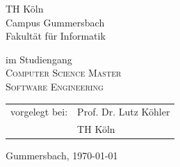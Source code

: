 \begin{titlepage}
\begin{center}
\begin{large} 
\vspace{0.2cm}
\begin{scshape}
TH Köln\\
Campus Gummersbach\\
Fakultät für Informatik
\end{scshape}
\end{large}

\vspace{0.4cm}

\begin{large}
im Studiengang\\ 
\vspace{0.2cm}
\textsc{Computer Science Master \\
Software Engineering}
\end{large}


\vspace{1.0cm}

\begin{tabular}{rl}
	vorgelegt bei:  &  Prof. Dr. Lutz Köhler\\
       					&  \small TH Köln \\[1.0em]
\end{tabular}

\vspace{1.6cm}

\begin{large}
Gummersbach, {\today}
\end{large}
\end{center}

\vspace{2.0cm}

\newpage
\thispagestyle{empty}

\end{titlepage}
